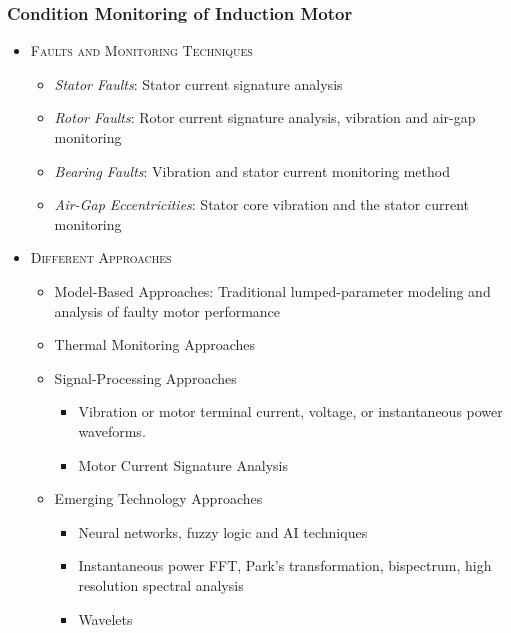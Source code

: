 \documentclass[9pt]{beamer}
\begin{document}
\begin{frame}
\frametitle{Condition Monitoring of Induction Motor}


\begin{itemize} 
\item \textsc{Faults and Monitoring Techniques}
    \begin{itemize}
    \item \emph{Stator Faults}: Stator current signature analysis
    \item \emph{Rotor Faults}: Rotor current signature analysis, vibration and air-gap monitoring
    \item \emph{Bearing Faults}: Vibration and stator current monitoring method
    \item \emph{Air-Gap  Eccentricities}: Stator core vibration and the stator current monitoring
    \end{itemize}
\item \textsc{Different Approaches}
    \begin{itemize}
    \item Model-Based Approaches: Traditional lumped-parameter modeling and analysis of faulty motor performance
    \item Thermal Monitoring Approaches
    \item Signal-Processing Approaches
            \begin{itemize}
            \item Vibration or motor terminal current, voltage, or instantaneous power waveforms.
            \item Motor  Current  Signature  Analysis
            \end{itemize}
    \item Emerging Technology Approaches
            \begin{itemize}
            \item Neural networks, fuzzy logic and AI techniques
            \item Instantaneous power FFT, Park's transformation, bispectrum, high resolution spectral analysis
            \item Wavelets
            \end{itemize}
    \end{itemize}
\end{itemize}
\end{frame}
\end{document}
